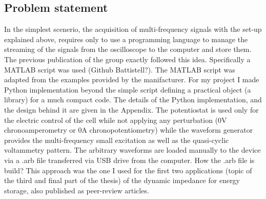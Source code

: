 \subsection{Problem statement}
In the simplest scenerio, the acquisition of multi-frequency signals with the set-up explained above, requires only to use a programming language to manage the streaming of the signals from the oscilloscope to the computer and store them. The previous publication of the group exactly followed this idea. Specifically a MATLAB script was used (Github Battistell?). The MATLAB script was adapted from the examples provided by the manifacturer. For my project I made Python implementation beyond the simple script defining a practical object (a library) for a much compact code. The details of the Python implementation, and the design behind it are given in the Appendix. The potentiostat is used only for the electric control of the cell while not applying any perturbation (0V chronoamperometry or 0A chronopotentiometry) while the waveform generator provides the multi-frequency small excitation as well as the quasi-cyclic voltammetry pattern. The arbitrary waveforms are loaded manually to the device via a .arb file transferred via USB drive from the computer. How the .arb file is build?
This approach was the one I used for the first two applications (topic of the third and final part of the thesis) of the dynamic impedance for energy storage, also published as peer-review articles.\\
